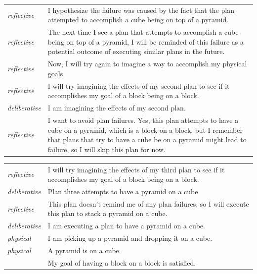 \begin{tabular}{p{2cm}p{8cm}}
  {\emph{reflective}} & I hypothesize the failure was caused by the
  fact that the plan attempted to accomplish a cube being on top of a
  pyramid. \\

  {\emph{reflective}} & The next time I see a plan that attempts to
  accomplish a cube being on top of a pyramid, I will be reminded of
  this failure as a potential outcome of executing similar plans in
  the future. \\

  {\emph{reflective}} & Now, I will try again to imagine a way to
  accomplish my physical goals. \\

  {\emph{reflective}} & I will try imagining the effects of my second
  plan to see if it accomplishes my goal of a block being on a
  block. \\

  {\emph{deliberative}} & I am imagining the effects of my second plan. \\

  {\emph{reflective}} & I want to avoid plan failures.  Yes, this plan
  attempts to have a cube on a pyramid, which is a block on a block,
  but I remember that plans that try to have a cube be on a pyramid
  might lead to failure, so I will skip this plan for now. \\
\end{tabular}

\begin{tabular}{p{2cm}p{8cm}}
  {\emph{reflective}} & I will try imagining the effects of my third
  plan to see if it accomplishes my goal of a block being on a
  block. \\
  
  {\emph{deliberative}} & Plan three attempts to have a pyramid on a cube \\
  
  {\emph{reflective}} & This plan doesn't remind me of any plan
  failures, so I will execute this plan to stack a pyramid on a
  cube. \\

  {\emph{deliberative}} & I am executing a plan to have a pyramid on a cube. \\
  
  {\emph{physical}} & I am picking up a pyramid and dropping it on a cube. \\

  {\emph{physical}} & A pyramid is on a cube. \\

  & My goal of having a block on a block is satisfied. \\
\end{tabular}


